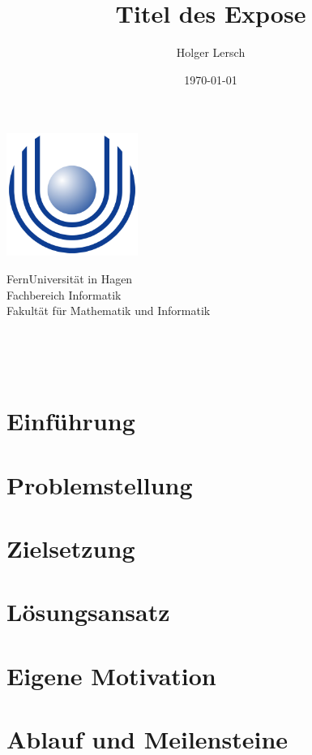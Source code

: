 \documentclass[a4paper,oneside,11pt]{article}
\title{Titel des Expose}
\author{Holger Lersch}
\date{\today}
\begin{document}
\begin{titlingpage} %
\begin{center}
\includegraphics[height=4cm]{images/Uni_hagen_logo}\\ %
\begin{large}
FernUniversit\"at in Hagen \\ %
Fachbereich Informatik\\
Fakult\"at f\"ur Mathematik und Informatik\\
\end{large}
\vspace{4cm} %
\begin{large} 
\textbf{\thetitle} \\
\end{large}
\theauthor\\
\vspace{7cm} %
\thedate
\end{center}
\end{titlingpage}

\section{Einf\"uhrung}

\section{Problemstellung}

\section{Zielsetzung}

\section{L\"osungsansatz}

\section{Eigene Motivation}

\section{Ablauf und Meilensteine}
\end{document}
